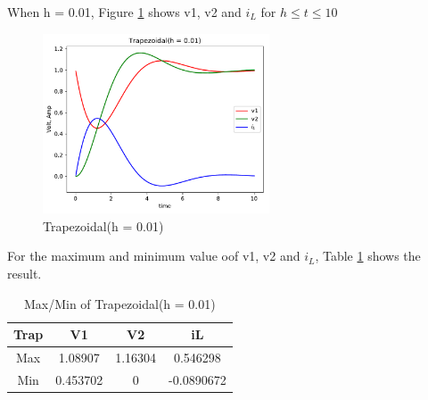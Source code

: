 \documentclass{article}
\begin{document}
When h = 0.01, Figure \ref{fig:trap 001} shows v1, v2 and $i_L$ for $h \leq t \leq 10$
\begin{figure}[H]
    \centering
    \includegraphics[width=0.6\textwidth]{src/trap_001.pdf}
    \caption{Trapezoidal(h = 0.01)}
    \label{fig:trap 001}
\end{figure}
For the maximum and minimum value oof v1, v2 and $i_L$, Table \ref{tab:trap 001} shows the result.
\begin{table}[H]
    \begin{center}
        \begin{tabular}{|c|c|c|c|}
            \hline
            Trap & V1 & V2 & iL \\ \hline
            Max & 1.08907 & 1.16304 & 0.546298 \\ \hline
            Min & 0.453702 & 0 & -0.0890672 \\ \hline
        \end{tabular}
    \end{center}
    \caption{Max/Min of Trapezoidal(h = 0.01)}
    \label{tab:trap 001}
\end{table}
\end{document}
